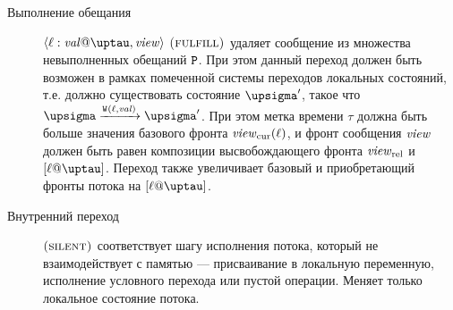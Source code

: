 \begin{description}
  \item[Выполнение обещания] $\writeEvt{\loc}{\stval}{\tau}{\R}$ $\textsc{(fulfill)}$ удаляет сообщение из множества
    невыполненных обещаний $\mathtt{P}$. При этом данный переход должен быть возможен в
    рамках помеченной системы переходов локальных состояний, т.е. должно существовать
    состояние $\pstate'$, такое что $\pstate \xrightarrow{\wlab{}{\loc}{\stval}} \pstate'$.
    При этом метка времени $\tau$ должна быть больше значения базового фронта $\mathit{view}_{\mathrm{cur}}(\ell)$,
    и фронт сообщения $\mathit{view}$ должен быть равен композиции высвобождающего фронта $\mathit{view}_{\mathrm{rel}}$
    и $[\loc@\tau]$. Переход также увеличивает базовый и приобретающий фронты потока на $[\loc@\tau]$.

  \item[Внутренний переход] $\textsc{(silent)}$ соответствует шагу исполнения потока, который не взаимодействует
    с памятью --- присваивание в локальную переменную, исполнение условного перехода или пустой операции.
    Меняет только локальное состояние потока.
\end{description}
